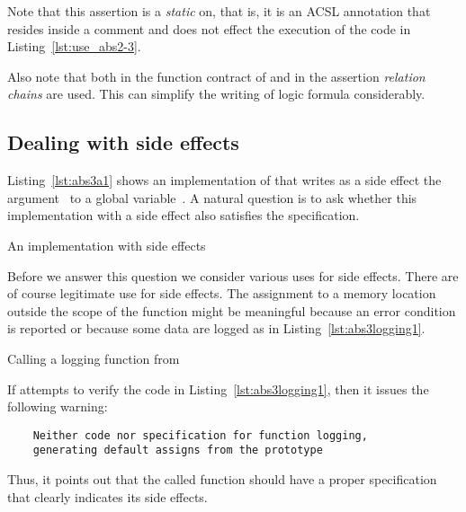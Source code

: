 Note that this assertion is a \emph{static} on, that is, it is
an ACSL annotation that resides inside a comment and does not effect
the execution of the code in Listing~\ref{lst:use_abs2-3}.

Also note that both in the function contract of  and
in the assertion \emph{relation chains} are used.
This can simplify the writing of logic formula considerably.

\clearpage

\subsection{Dealing with side effects}

Listing~\ref{lst:abs3a1} shows an implementation of 
that writes as a side effect the argument~ to a global variable~.
A natural question is to ask whether this implementation with a side effect
also satisfies the specification.

\begin{listing}[hbt]
\begin{minipage}{\textwidth}

\end{minipage}
\caption{\label{lst:abs3a1} An implementation with side effects}
\end{listing}

\FloatBarrier

Before we answer this question we consider various uses for side effects.
There are of course legitimate use for side effects.
The assignment to a memory location outside the scope of the function
might be meaningful because an error condition is reported or because
some data are logged as in Listing~\ref{lst:abs3logging1}.

\begin{listing}[hbt]
\begin{minipage}{\textwidth}

\end{minipage}
\caption{\label{lst:abs3logging1} Calling a logging function from }
\end{listing}

If \framacwp attempts to verify the code in Listing~\ref{lst:abs3logging1},
then it issues the following warning:
%
\begin{small}
\begin{verbatim}
    Neither code nor specification for function logging,
    generating default assigns from the prototype
\end{verbatim}
\end{small}
%
Thus, it points out that the called function  should have a proper
specification that clearly indicates its side effects.

